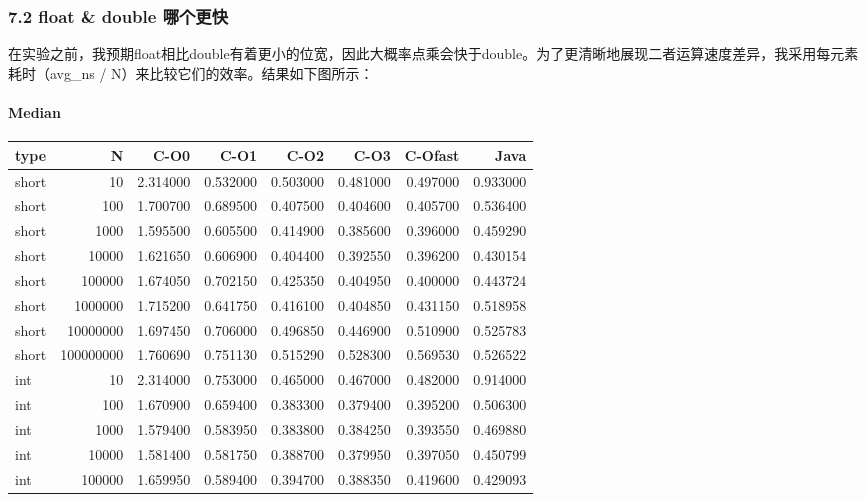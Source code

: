 \documentclass[12pt,fontset=none]{ctexart}
\newcounter{none}
\begin{document}
\subsubsection{7.2 float \& double
哪个更快}\label{72-float--double-ux54eaux4e2aux66f4ux5feb}

在实验之前，我预期float相比double有着更小的位宽，因此大概率点乘会快于double。为了更清晰地展现二者运算速度差异，我采用每元素耗时（avg\_ns
/ N）来比较它们的效率。结果如下图所示：

\paragraph{Median}\label{median}

{\def\LTcaptype{none} %
\begin{longtable}[]{@{}lrrrrrrr@{}}
\toprule\noalign{}
type & N & C-O0 & C-O1 & C-O2 & C-O3 & C-Ofast & Java \\
\midrule\noalign{}
\endhead
\bottomrule\noalign{}
\endlastfoot
short & 10 & 2.314000 & 0.532000 & 0.503000 & 0.481000 & 0.497000 &
0.933000 \\
short & 100 & 1.700700 & 0.689500 & 0.407500 & 0.404600 & 0.405700 &
0.536400 \\
short & 1000 & 1.595500 & 0.605500 & 0.414900 & 0.385600 & 0.396000 &
0.459290 \\
short & 10000 & 1.621650 & 0.606900 & 0.404400 & 0.392550 & 0.396200 &
0.430154 \\
short & 100000 & 1.674050 & 0.702150 & 0.425350 & 0.404950 & 0.400000 &
0.443724 \\
short & 1000000 & 1.715200 & 0.641750 & 0.416100 & 0.404850 & 0.431150 &
0.518958 \\
short & 10000000 & 1.697450 & 0.706000 & 0.496850 & 0.446900 & 0.510900
& 0.525783 \\
short & 100000000 & 1.760690 & 0.751130 & 0.515290 & 0.528300 & 0.569530
& 0.526522 \\
int & 10 & 2.314000 & 0.753000 & 0.465000 & 0.467000 & 0.482000 &
0.914000 \\
int & 100 & 1.670900 & 0.659400 & 0.383300 & 0.379400 & 0.395200 &
0.506300 \\
int & 1000 & 1.579400 & 0.583950 & 0.383800 & 0.384250 & 0.393550 &
0.469880 \\
int & 10000 & 1.581400 & 0.581750 & 0.388700 & 0.379950 & 0.397050 &
0.450799 \\
int & 100000 & 1.659950 & 0.589400 & 0.394700 & 0.388350 & 0.419600 &
0.429093 \\

\end{longtable}}
\end{document}
